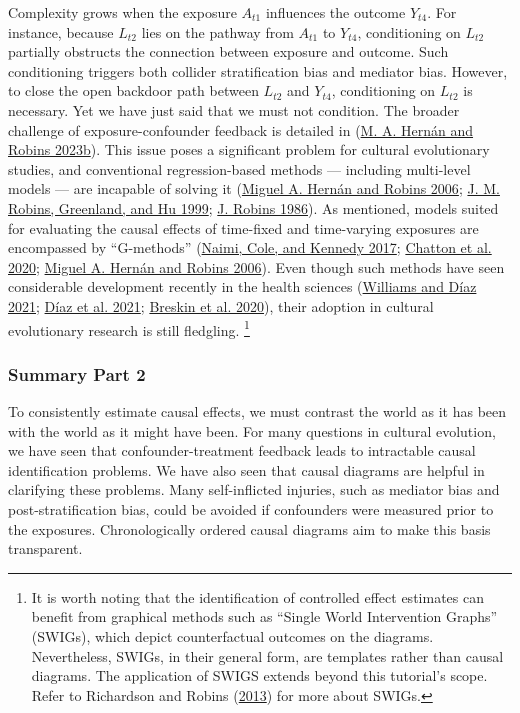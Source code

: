 \documentclass[
  singlecolumn]{article}
\begin{document}
Complexity grows when the exposure \(A_{t1}\) influences the outcome
\(Y_{t4}\). For instance, because \(L_{t2}\) lies on the pathway from
\(A_{t1}\) to \(Y_{t4}\), conditioning on \(L_{t2}\) partially obstructs
the connection between exposure and outcome. Such conditioning triggers
both collider stratification bias and mediator bias. However, to close
the open backdoor path between \(L_{t2}\) and \(Y_{t4}\), conditioning
on \(L_{t2}\) is necessary. Yet we have just said that we must not
condition. The broader challenge of exposure-confounder feedback is
detailed in (\protect\hyperlink{ref-hernuxe1n2023a}{M. A. Hernán and
Robins 2023b}). This issue poses a significant problem for cultural
evolutionary studies, and conventional regression-based methods ---
including multi-level models --- are incapable of solving it
(\protect\hyperlink{ref-hernuxe1n2006}{Miguel A. Hernán and Robins
2006}; \protect\hyperlink{ref-robins1999}{J. M. Robins, Greenland, and
Hu 1999}; \protect\hyperlink{ref-robins1986}{J. Robins 1986}). As
mentioned, models suited for evaluating the causal effects of time-fixed
and time-varying exposures are encompassed by ``G-methods''
(\protect\hyperlink{ref-naimi2017}{Naimi, Cole, and Kennedy 2017};
\protect\hyperlink{ref-chatton2020}{Chatton et al. 2020};
\protect\hyperlink{ref-hernuxe1n2006}{Miguel A. Hernán and Robins
2006}). Even though such methods have seen considerable development
recently in the health sciences
(\protect\hyperlink{ref-williams2021}{Williams and Díaz 2021};
\protect\hyperlink{ref-duxedaz2021}{Díaz et al. 2021};
\protect\hyperlink{ref-breskin2020}{Breskin et al. 2020}), their
adoption in cultural evolutionary research is still fledgling.
\footnote{It is worth noting that the identification of controlled
  effect estimates can benefit from graphical methods such as ``Single
  World Intervention Graphs'' (SWIGs), which depict counterfactual
  outcomes on the diagrams. Nevertheless, SWIGs, in their general form,
  are templates rather than causal diagrams. The application of SWIGS
  extends beyond this tutorial's scope. Refer to Richardson and Robins
  (\protect\hyperlink{ref-richardson2013}{2013}) for more about SWIGs.}

\hypertarget{summary-part-2}{%
\subsubsection{Summary Part 2}\label{summary-part-2}}

To consistently estimate causal effects, we must contrast the world as
it has been with the world as it might have been. For many questions in
cultural evolution, we have seen that confounder-treatment feedback
leads to intractable causal identification problems. We have also seen
that causal diagrams are helpful in clarifying these problems. Many
self-inflicted injuries, such as mediator bias and post-stratification
bias, could be avoided if confounders were measured prior to the
exposures. Chronologically ordered causal diagrams aim to make this
basis transparent.
\end{document}
